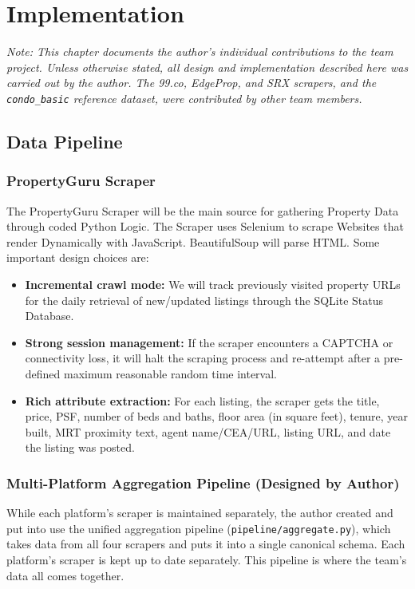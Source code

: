 \chapter{Implementation}

\textit{Note: This chapter documents the author's individual contributions to the team project. Unless otherwise stated, all design and implementation described here was carried out by the author. The 99.co, EdgeProp, and SRX scrapers, and the \texttt{condo\_basic} reference dataset, were contributed by other team members.}

\section{Data Pipeline}

\subsection{PropertyGuru Scraper}

The PropertyGuru Scraper will be the main source for gathering Property Data through coded Python Logic. The Scraper uses Selenium to scrape Websites that render Dynamically with JavaScript. BeautifulSoup will parse HTML. Some important design choices are:

\begin{itemize}
    \item \textbf{Incremental crawl mode:} We will track previously visited property URLs for the daily retrieval of new/updated listings through the SQLite Status Database.
    \item \textbf{Strong session management:} If the scraper encounters a CAPTCHA or connectivity loss, it will halt the scraping process and re-attempt after a pre-defined maximum reasonable random time interval.
    \item \textbf{Rich attribute extraction:} For each listing, the scraper 
    gets the title, price, PSF, number of beds and baths, floor area (in square 
    feet), tenure, year built, MRT proximity text, agent name/CEA/URL, listing 
    URL, and date the listing was posted.
\end{itemize}

\subsection{Multi-Platform Aggregation Pipeline (Designed by Author)}

While each platform's scraper is maintained separately, the author created and 
put into use the unified aggregation pipeline (\texttt{pipeline/aggregate.py}), 
which takes data from all four scrapers and puts it into a single canonical 
schema. Each platform's scraper is kept up to date separately. This pipeline 
is where the team's data all comes together.

